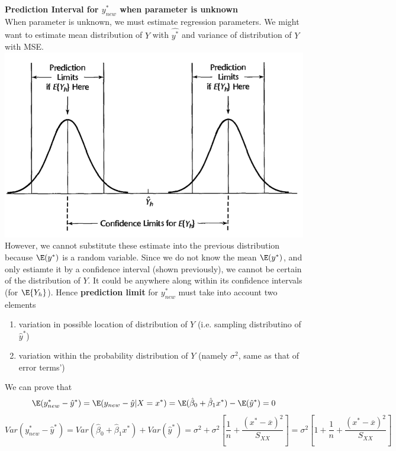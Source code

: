 \documentclass[11pt]{article}
\begin{document}
\begin{defn*}
    \textbf{Prediction Interval for $y^*_{new}$ when parameter is unknown} \\
    When parameter is unknown, we must estimate regression parameters. We might want to estimate mean distribution of $Y$ with $\hat{y^*}$ and variance of distribution of $Y$ with MSE. 
    \includegraphics[width=\textwidth/2]{prediction_interval_conf_lim}  \\
    However, we cannot substitute these estimate into the previous distribution because $\E(y^*)$ is a random variable. Since we do not know the mean $\E(y^*)$, and only estiamte it by a confidence interval (shown previously), we cannot be certain of the distribution of $Y$. It could be anywhere along within its confidence intervals (for $\E\{Y_h\}$). Hence \textbf{prediction limit} for $y^*_{new}$ must take into account two elements
    \begin{enumerate}
        \item variation in possible location of distribution of $Y$ (i.e. sampling distributino of $\hat{y}^*$)
        \item variation within the probability distribution of $Y$ (namely $\sigma^2$, same as that of error terms')
    \end{enumerate}
    We can prove that
    \[
        \E(y^*_{new} - \hat{y}^*) 
        = \E(y_{new} - \hat{y}|X = x^*)
        = \E(\hat{\beta}_0 + \hat{\beta}_1 x^*) - \E(\hat{y}^*) 
        = 0
    \]
    \[
        Var(y^*_{new} - \hat{y}^*) 
        = Var(\hat{\beta}_0 + \hat{\beta}_1 x^*) + Var(\hat{y}^*)
        = \sigma^2 + \sigma^2 \left[ \frac{1}{n} + \frac{(x^* - \overline{x})^2}{S_{XX}} \right]
        = \sigma^2 \left[ 1+ \frac{1}{n} +\frac{(x^* - \overline{x})^2}{S_{XX}} \right]
\]
\end{defn*}
\end{document}
